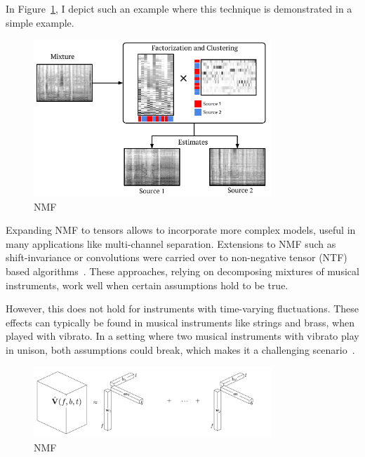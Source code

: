 {{In Figure~\ref{fig:nmf_separation}, I depict such an example where this technique is demonstrated in a simple example. 

\begin{figure}
  \centering
  \includegraphics[width=0.8\textwidth]{Chapters/06_Separation_Unknown/figures/nmf_separation.pdf}
  \caption{NMF}
  \label{fig:nmf_separation}
\end{figure}


\par
Expanding NMF to tensors allows to incorporate more complex models, useful in many applications like multi-channel separation.
Extensions to NMF such as shift-invariance or convolutions were carried over to non-negative tensor (NTF) based algorithms~\cite{fitzgerald05, fitzgerald08, fitzgerald06, fevotte10, ozerov11}. These approaches, relying on decomposing mixtures of musical instruments, work well when certain assumptions hold to be true.

However, this does not hold for instruments with time-varying fluctuations. These effects can typically be found in musical instruments like strings and brass, when played with vibrato. In a setting where two musical instruments with vibrato play in unison, both assumptions could break, which makes it a challenging scenario~\cite{stoeter14}.\\

\begin{figure}
  \centering
  \includegraphics[width=0.8\textwidth]{Chapters/06_Separation_Unknown/figures/cpd.pdf}
  \caption{NMF }
  \label{fig:cpd}
\end{figure}

}}
